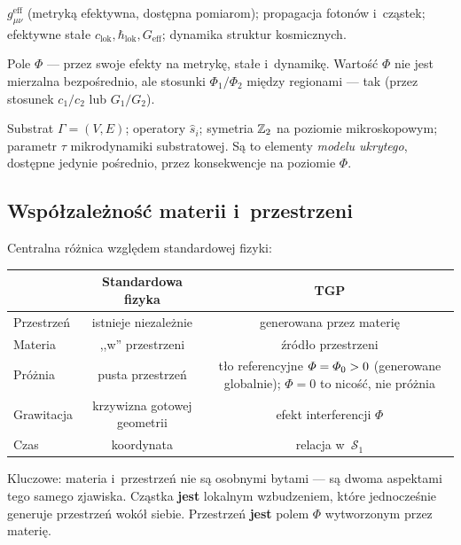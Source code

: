 \begin{remark}\label{rem:obserwowalne}
\begin{description}[style=nextline, nosep]
  \item[\textbf{Obserwowalne bezpo\'srednio}:]
    $g_{\mu\nu}^{\mathrm{eff}}$ (metryk\k{a} efektywna, dost\k{e}pna
    pomiarom); propagacja foton\'ow i~cz\k{a}stek;
    efektywne sta\l{}e $c_{\mathrm{lok}}, \hbar_{\mathrm{lok}},
    G_{\mathrm{eff}}$; dynamika struktur kosmicznych.
  \item[\textbf{Obserwowalne po\'srednio}:]
    Pole $\Phi$ --- przez swoje efekty na metryk\k{e},
    sta\l{}e i~dynamik\k{e}. Warto\'s\'c $\Phi$ nie jest
    mierzalna bezpo\'srednio, ale stosunki $\Phi_1/\Phi_2$
    mi\k{e}dzy regionami --- tak (przez stosunek $c_1/c_2$
    lub $G_1/G_2$).
  \item[\textbf{Nieobserwowalne bezpo\'srednio}:]
    Substrat $\Gamma = (V, E)$; operatory $\hat{s}_i$;
    symetria $\mathbb{Z}_2$ na poziomie mikroskopowym;
    parametr $\tau$ mikrodynamiki substratowej.
    S\k{a} to elementy \emph{modelu ukrytego}, dost\k{e}pne
    jedynie po\'srednio, przez konsekwencje na poziomie $\Phi$.
\end{description}
\end{remark}

\subsection{Wsp\'o\l{}zale\.zno\'s\'c materii i~przestrzeni}\label{ssec:wspolzaleznosc}

Centralna r\'o\.znica wzgl\k{e}dem standardowej fizyki:

\begin{center}
\begin{tabular}{lcc}
\toprule
& \textbf{Standardowa fizyka} & \textbf{TGP} \\
\midrule
Przestrze\'n & istnieje niezale\.znie & generowana przez materi\k{e} \\
Materia & ,,w'' przestrzeni & \'zr\'od\l{}o przestrzeni \\
Pr\'o\.znia & pusta przestrze\'n & t\l{}o referencyjne $\varPhi = \varPhi_0 > 0$
  (generowane globalnie); $\Phi = 0$ to nico\'s\'c, nie pr\'o\.znia \\
Grawitacja & krzywizna gotowej geometrii & efekt interferencji $\Phi$ \\
Czas & koordynata & relacja w~$\mathcal{S}_1$ \\
\bottomrule
\end{tabular}
\end{center}

Kluczowe: materia i~przestrze\'n nie s\k{a} osobnymi bytami ---
s\k{a} dwoma aspektami tego samego zjawiska. Cz\k{a}stka
\textbf{jest} lokalnym wzbudzeniem, kt\'ore jednocze\'snie
generuje przestrze\'n wok\'o\l{} siebie. Przestrze\'n \textbf{jest}
polem $\Phi$ wytworzonym przez materi\k{e}.
